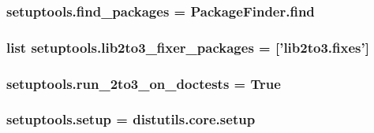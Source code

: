 \subsubsection[{find\+\_\+packages}]{\setlength{\rightskip}{0pt plus 5cm}setuptools.\+find\+\_\+packages = {\bf Package\+Finder.\+find}}\label{namespacesetuptools_af3f752d8ed43dd0bf1640292cf7f2540}
\hypertarget{namespacesetuptools_a2a9aa3f4107914fedf47fbf0b6c97620}{}
\subsubsection[{lib2to3\+\_\+fixer\+\_\+packages}]{\setlength{\rightskip}{0pt plus 5cm}list setuptools.\+lib2to3\+\_\+fixer\+\_\+packages = \mbox{[}'lib2to3.\+fixes'\mbox{]}}\label{namespacesetuptools_a2a9aa3f4107914fedf47fbf0b6c97620}
\hypertarget{namespacesetuptools_a02cbd18fe112cad981fe27383fd1ee93}{}
\subsubsection[{run\+\_\+2to3\+\_\+on\+\_\+doctests}]{\setlength{\rightskip}{0pt plus 5cm}setuptools.\+run\+\_\+2to3\+\_\+on\+\_\+doctests = {\bf True}}\label{namespacesetuptools_a02cbd18fe112cad981fe27383fd1ee93}
\hypertarget{namespacesetuptools_a3347a1832befe1bf0e593b4c8bf7c9f8}{}
\subsubsection[{setup}]{\setlength{\rightskip}{0pt plus 5cm}setuptools.\+setup = distutils.\+core.\+setup}\label{namespacesetuptools_a3347a1832befe1bf0e593b4c8bf7c9f8}
